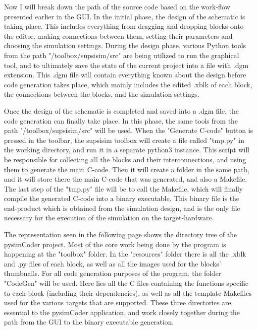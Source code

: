 \quad Now I will break down the path of the source code based on the work-flow presented earlier in the GUI. In the initial phase,
the design of the schematic is taking place. This includes everything from dragging and dropping blocks onto the editor, making
connections between them, setting their parameters and choosing the simulation settings. During the design phase, various Python
tools from the path "/toolbox/supsisim/src" are being utilized to run the graphical tool, and to ultimately save the state of the
current project into a file with .dgm extension. This .dgm file will contain everything known about the design before code
generation takes place, which mainly includes the edited .xblk of each block, the connections between the blocks, and the
simulation settings.

\quad Once the design of the schematic is completed and saved into a .dgm file, the code generation can finally take place.
In this phase, the same tools from the path "/toolbox/supsisim/src" will be used. When the "Generate C-code" button is pressed
in the toolbar, the supsisim toolbox will create a file called "tmp.py" in the working directory, and run it in a separate python3
instance. This script will be responsible for collecting all the blocks and their interconnections, and using them to generate the main
C-code. Then it will create a folder in the same path, and it will store there the main C-code that was generated, and also a Makefile.
The last step of the "tmp.py" file will be to call the Makefile, which will finally compile the generated C-code into a binary
executable. This binary file is the end-product which is obtained from the simulation design, and is the only file necessary
for the execution of the simulation on the target-hardware.

\quad The representation seen in the following page shows the directory tree of the pysimCoder project. Most of the core work
being done by the program is happening at the "toolbox" folder. In the "resources" folder there is all the .xblk and .py files
of each block, as well as all the images used for the blocks' thumbnails. For all code generation purposes of the program, the
folder "CodeGen" will be used. Here lies all the C files containing the functions specific to each block (including their
dependencies), as well as all the template Makefiles used for the various targets that are supported. These three directories are
essential to the pysimCoder application, and work closely together during the path from the GUI to the binary executable generation.

